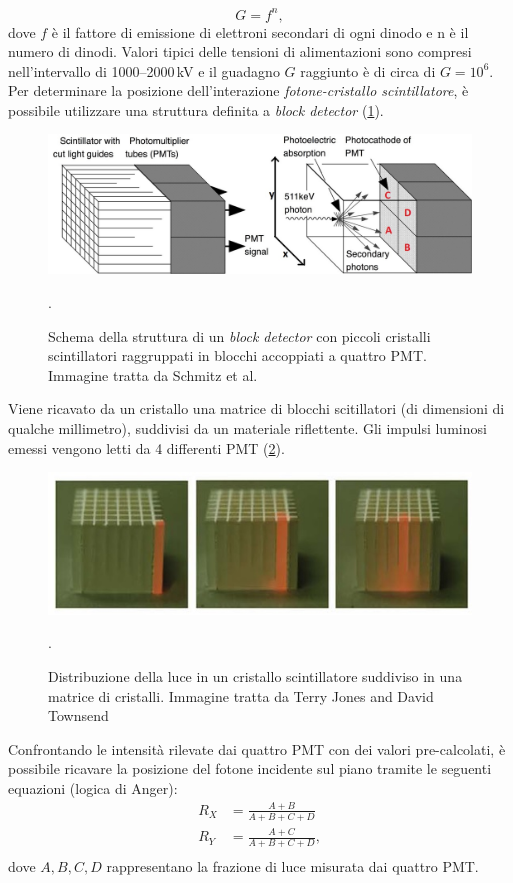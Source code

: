 \begin{equation}
	G = f^n,
\end{equation}
dove $f$ è il fattore di emissione di elettroni secondari di ogni dinodo e n è il numero di dinodi. Valori tipici delle tensioni di alimentazioni sono  compresi nell'intervallo di \numrange[range-phrase=--]{1000}{2000}\,\unit{\kilo\volt} e il guadagno $G$ raggiunto è di circa di $G=10^6$. Per determinare la posizione dell'interazione \textit{fotone-cristallo scintillatore}, è possibile utilizzare una struttura definita a \textit{block detector} (\Fig\ref{fig:block_detector}).
\begin{figure}[tbh]
	\centering
	\includegraphics[width=0.8\linewidth]{./ImageFiles/block_detector.jpg}
	\caption{Schema della struttura di un \textit{block detector} con piccoli cristalli scintillatori raggruppati in blocchi accoppiati a quattro PMT. Immagine tratta da Schmitz et al. \cite{Schmitz2013ThePO}}. 
	\label{fig:block_detector}
\end{figure}
Viene ricavato da un cristallo una matrice di blocchi scitillatori (di dimensioni di qualche millimetro), suddivisi da un materiale riflettente. Gli impulsi luminosi emessi vengono letti da 4 differenti PMT (\Fig\ref{fig:block_detector_cube}).
\begin{figure}[tbh]
	\centering
	\includegraphics[width=0.6\linewidth]{./ImageFiles/block_detector_lightoncube.jpg}
	\caption{Distribuzione della luce in un cristallo scintillatore suddiviso in una matrice di cristalli. Immagine tratta da Terry Jones and David Townsend \cite{Jones2017}}. 
	\label{fig:block_detector_cube}
\end{figure}
Confrontando le intensità rilevate dai quattro PMT con dei valori pre-calcolati, è possibile ricavare la posizione del fotone incidente sul piano tramite le seguenti equazioni \cite{RamseyDerek} (logica di Anger):
\begin{equation}
	\begin{split}
		R_X&=\frac{A+B}{A+B+C+D} \\
		R_Y&=\frac{A+C}{A+B+C+D}, \\
	\end{split}
\end{equation}
dove $A,B,C,D$ rappresentano la frazione di luce misurata dai quattro PMT.

